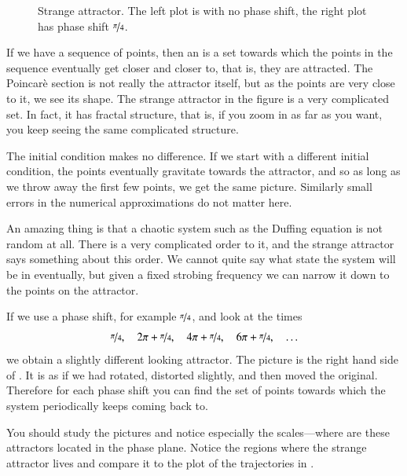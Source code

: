 \begin{figure}[h!t]
\capstart
\begin{center}
\caption{Strange attractor.  The left plot 
is with no phase shift, the right plot has phase shift
$\nicefrac{\pi}{4}$. \label{nlin:strange}}
\end{center}
\end{figure}

If we have a sequence of points, then 
an \emph{} is a set towards which the points
in the sequence
eventually get closer and closer to, that is, they are attracted.  The
Poincar\`e section is not really the attractor itself, but as
the points are very close to it, we see its shape.  The strange
attractor in the figure is a very complicated set.   In fact, it has
fractal structure, that is, if you zoom in as far as you want, you
keep seeing the same complicated structure.

The initial condition makes no difference.  If
we start with a different initial condition, the points eventually
gravitate towards the attractor, and so as long as we throw away the first
few points, we get the same picture.
Similarly small errors in the numerical approximations do not matter here.

An amazing thing is that a chaotic system such as the Duffing equation is
not random at all.  There is a very complicated order to it, and the strange
attractor says something about this order.  We cannot quite say what state
the system will be in eventually, but given a fixed strobing frequency we
can narrow it down to the points on the attractor.

If we use a phase shift, for example $\nicefrac{\pi}{4}$, and look at the
times
\begin{equation*}
\nicefrac{\pi}{4}, \quad
2\pi+\nicefrac{\pi}{4}, \quad
4\pi+\nicefrac{\pi}{4}, \quad
6\pi+\nicefrac{\pi}{4}, \quad
\ldots
\end{equation*}
we obtain a slightly different looking attractor.
The picture is the right hand side of 
.
It is as if we had
rotated, distorted slightly, and then moved the original.
Therefore for each phase shift you can find the
set of points towards which the system periodically keeps coming back to.

You should study the pictures and notice especially the scales---where are
these attractors located in the phase plane.  Notice the
regions where the strange attractor lives and compare it to the plot of the
trajectories in .

